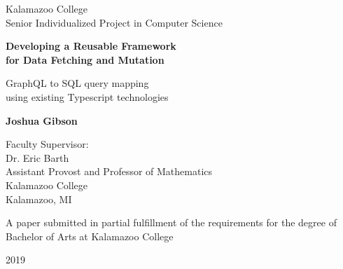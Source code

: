 \documentclass[12pt]{article}
\begin{document}
\begin{titlepage}
   \begin{center}
        Kalamazoo College\\
        Senior Individualized Project in Computer Science
       \vspace*{3cm}
 
       \textbf{Developing a Reusable Framework\\
        for Data Fetching and Mutation}
 
       \vspace{0.3cm}
       GraphQL to SQL query mapping\\
       using existing Typescript technologies
 
       \vspace{1.5cm}
 
       \textbf{Joshua Gibson}
 
       \vspace{4cm}
 
       Faculty Supervisor:\\
       Dr. Eric Barth\\
       Assistant Provost and Professor of Mathematics\\
       Kalamazoo College\\
       Kalamazoo, MI
       
       \vspace{3cm}
       
       A paper submitted in partial fulfillment of the requirements for the degree of Bachelor of Arts at Kalamazoo College
       
       \vspace{2cm}
       2019
 
   \end{center}
\end{titlepage}


\null \newpage


\setcounter{page}{2}

\doublespacing


\newpage


\newpage
\singlespacing
\tableofcontents
\doublespacing
\newpage

\listoffigures
\newpage

















\newpage
\setcounter{page}{1}


\newpage
\printbibliography
{}
%
%
\end{document}
